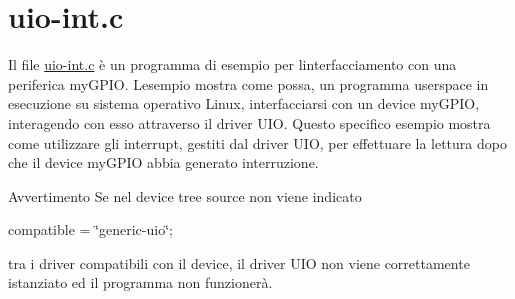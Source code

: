\hypertarget{uio-int_8c-example}{}\section{uio-\/int.\+c}
Il file \hyperlink{uio-int_8c}{uio-\/int.\+c} è un programma di esempio per l\textquotesingle{}interfacciamento con una periferica my\+G\+P\+IO. L\textquotesingle{}esempio mostra come possa, un programma userspace in esecuzione su sistema operativo Linux, interfacciarsi con un device my\+G\+P\+IO, interagendo con esso attraverso il driver U\+IO. Questo specifico esempio mostra come utilizzare gli interrupt, gestiti dal driver U\+IO, per effettuare la lettura dopo che il device my\+G\+P\+IO abbia generato interruzione.

\begin{DoxyWarning}{Avvertimento}
Se nel device tree source non viene indicato \begin{center}compatible = \char`\"{}generic-\/uio\char`\"{};\end{center}  tra i driver compatibili con il device, il driver U\+IO non viene correttamente istanziato ed il programma non funzionerà.
\end{DoxyWarning}

